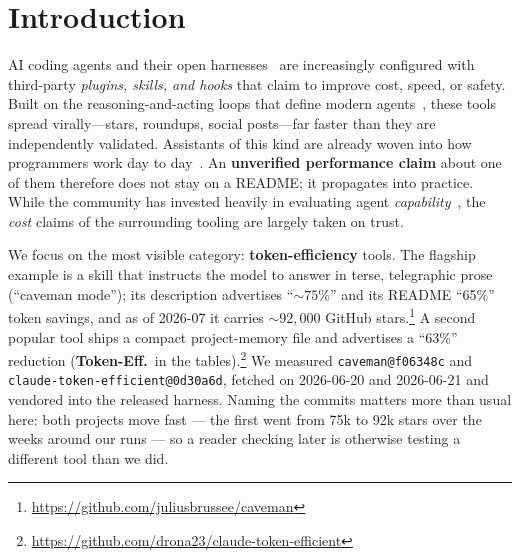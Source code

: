 

\maketitle

\section{Introduction}
\label{sec:intro}
AI coding agents and their open harnesses~\cite{yang2024sweagent} are increasingly configured with
third-party \emph{plugins, skills, and hooks} that claim to improve cost, speed, or safety. Built on
the reasoning-and-acting loops that define modern agents~\cite{yao2023react,schick2023toolformer},
these tools spread virally---stars, roundups, social posts---far faster than they are independently
validated. Assistants of this kind are already woven into how programmers work day to
day~\cite{barke2023grounded}. An \textbf{unverified performance claim} about one of them therefore does
not stay on a README; it propagates into practice. While the
community has invested heavily in evaluating agent
\emph{capability}~\cite{jimenez2024swebench,jain2025livecodebench,liu2024seagentsurvey},
the \emph{cost} claims of the surrounding tooling are largely taken on trust.

We focus on the most visible category: \textbf{token-efficiency} tools. The flagship example is a
skill that instructs the model to answer in terse, telegraphic prose (``caveman mode''); its
description advertises ``${\sim}75\%$'' and its README ``65\%'' token savings, and as of
2026-07 it carries ${\sim}92{,}000$ GitHub
stars.\footnote{\url{https://github.com/juliusbrussee/caveman}} A second popular tool ships a compact
project-memory file and advertises a ``63\%'' reduction (\textbf{Token-Eff.}\ in the
tables).\footnote{\url{https://github.com/drona23/claude-token-efficient}} We measured
\texttt{caveman@f06348c} and \texttt{claude-token-efficient@0d30a6d}, fetched on 2026-06-20 and
2026-06-21 and vendored into the released harness. Naming the commits matters more than usual here:
both projects move fast --- the first went from 75k to 92k stars over the weeks around our runs ---
so a reader checking later is otherwise testing a different tool than we did.

